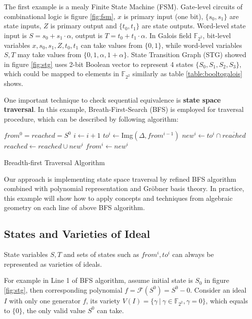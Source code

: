 The first example is a mealy Finite State Machine (FSM). Gate-level circuits of combinational logic
is figure \ref{fig:fsm}, $x$ is primary input (one bit),
$\{s_0, s_1\}$ are state inputs, $Z$ is primary output and $\{t_0, t_1\}$ are state outputs.
Word-level state input is $S = s_0 + s_1\cdot\alpha$, output is $T = t_0 + t_1\cdot\alpha$. In Galois field
$\mathbb{F}_{2^2}$, bit-level variables $x, s_0, s_1, Z, t_0, t_1$ can take values from $\{0, 1\}$, while
word-level variables $S, T$ may take values from $\{0, 1, \alpha, 1 + \alpha\}$. State Transition Graph (STG)
showed in figure \ref{fig:stg} uses 2-bit Boolean vector to represent 4 states $\{S_0, S_1, S_2, S_3\}$, which
could be mapped to elements in $\mathbb{F}_{2^2}$ similarly as table \ref{table:booltogalois} shows.

One important technique to check sequential equivalence is \textbf{state space traversal}. In this example,
Breath-First-Search (BFS) is employed for traversal procedure, which can be described by following algorithm\cite{KallaPartialScan}:

\begin{algorithm}[hbt]
\SetAlgoNoLine

  $from^0 = reached = S^0$\;
  {
  	$i \gets i + 1$\;
	$to^i \gets$Img$(\Delta, from^{i-1})$\;
	$new^i \gets to^i \cap \overline{reached}$\;
  	$reached \gets reached \cup new^i$\;
	$from^i \gets new^i$\;
  }
\caption {Breadth-first Traversal Algorithm}\label{alg:BFS}
\end{algorithm}

Our approach is implementing state space traversal by refined BFS algorithm combined with polynomial representation
and Gr\"obner basis theory. In practice, this example will show how to apply concepts and techniques from algebraic
geometry on each line of above BFS algorithm.

\subsection{States and Varieties of Ideal}

\begin{Theorem}
State variables $S, T$ and sets of states such as $from^i, to^i$ can always be represented as varieties of ideals.
\end{Theorem}
For example in Line 1 of BFS algorithm, assume initial state is $S_0$ in figure \ref{fig:stg}, then corresponding
polynomial $f = \mathcal{F}(S^0) = S^0 - 0$. Consider an ideal $I$ with only one generator $f$, its variety
$V(I) = \{\gamma\ |\ \gamma \in \mathbb{F}_{2^2}, \gamma = 0\}$, which equals to $\{0\}$, the only
valid value $S^0$ can take.


